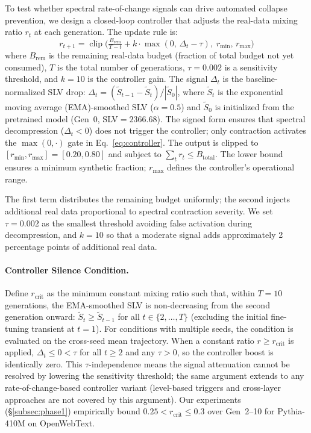 To test whether spectral rate-of-change signals can drive automated collapse prevention, we design a closed-loop controller that adjusts the real-data mixing ratio $r_t$ at each generation.
The update rule is:
\begin{equation}
\label{eq:controller}
r_{t+1} = \operatorname{clip}\!\bigl(\tfrac{B_{\text{rem}}}{T - t} + k \cdot \max(0,\,\Delta_t - \tau),\; r_{\min},\, r_{\max}\bigr)
\end{equation}
where $B_{\text{rem}}$ is the remaining real-data budget (fraction of total budget not yet consumed), $T$ is the total number of generations, $\tau{=}0.002$ is a sensitivity threshold, and $k{=}10$ is the controller gain.
The signal $\Delta_t$ is the baseline-normalized SLV drop: $\Delta_t = (\widetilde{S}_{t-1} - \widetilde{S}_t) / |\widetilde{S}_0|$, where $\widetilde{S}_t$ is the exponential moving average (EMA)-smoothed SLV ($\alpha{=}0.5$) and $\widetilde{S}_0$ is initialized from the pretrained model (Gen~0, SLV${=}2366.68$).
The signed form ensures that spectral decompression ($\Delta_t < 0$) does not trigger the controller; only contraction activates the $\max(0, \cdot)$ gate in Eq.~\ref{eq:controller}.
The output is clipped to $[r_{\min}, r_{\max}] = [0.20, 0.80]$ and subject to $\sum_t r_t \leq B_{\text{total}}$.
The lower bound ensures a minimum synthetic fraction; $r_{\max}$ defines the controller's operational range.

The first term distributes the remaining budget uniformly; the second injects additional real data proportional to spectral contraction severity.
We set $\tau{=}0.002$ as the smallest threshold avoiding false activation during decompression, and $k{=}10$ so that a moderate signal adds approximately 2 percentage points of additional real data.

\paragraph{Controller Silence Condition.}
Define $r_{\text{crit}}$ as the minimum constant mixing ratio such that, within $T{=}10$ generations, the EMA-smoothed SLV is non-decreasing from the second generation onward: $\widetilde{S}_t \geq \widetilde{S}_{t-1}$ for all $t \in \{2, \ldots, T\}$ (excluding the initial fine-tuning transient at $t{=}1$). For conditions with multiple seeds, the condition is evaluated on the cross-seed mean trajectory.
When a constant ratio $r \geq r_{\text{crit}}$ is applied, $\Delta_t \leq 0 < \tau$ for all $t \geq 2$ and any $\tau > 0$, so the controller boost is identically zero.
This $\tau$-independence means the signal attenuation cannot be resolved by lowering the sensitivity threshold; the same argument extends to any rate-of-change-based controller variant (level-based triggers and cross-layer approaches are not covered by this argument).
Our experiments (\S\ref{subsec:phase1}) empirically bound $0.25 < r_{\text{crit}} \leq 0.3$ over Gen~2--10 for Pythia-410M on OpenWebText.

